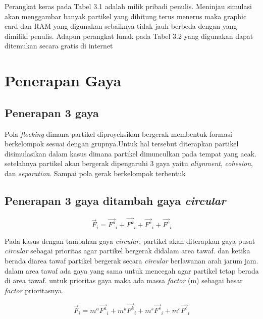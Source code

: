 \hspace{0.6cm}Perangkat keras pada Tabel 3.1 adalah milik pribadi penulis. Meninjau simulasi
akan menggambar banyak partikel yang dihitung terus menerus maka graphic card dan RAM yang digunakan sebaiknya tidak jauh berbeda dengan yang dimiliki
penulis. Adapun perangkat lunak pada Tabel 3.2 yang digunakan dapat ditemukan
secara gratis di internet



\section{Penerapan Gaya}

\subsection{Penerapan 3 gaya}
\hspace{0.6cm}Pola \emph{flocking} dimana partikel diproyeksikan bergerak membentuk formasi berkelompok sesuai dengan grupnya.Untuk hal tersebut diterapkan partikel disimulasikan dalam kasus dimana partikel dimunculkan pada tempat yang acak. setelahnya partikel akan bergerak dipengaruhi 3 gaya yaitu \emph{alignment}, \emph{cohesion}, dan \emph{separation}. Sampai pola gerak berkelompok terbentuk

\subsection{Penerapan 3 gaya ditambah gaya \emph{circular}}

\begin{equation}
\vec{F}_i = \vec{F^a}_i + \vec{F^k}_i + \vec{F^s}_i + \vec{F^c}_i
\end{equation}

\hspace{0.6cm}Pada kasus dengan tambahan gaya 
\emph{circular}, partikel akan diterapkan gaya pusat \emph{circular} sebagai prioritas agar partikel bergerak didalam area tawaf. dan ketika berada diarea tawaf partikel bergerak secara \emph{circular} berlawanan arah jarum jam. dalam area tawaf ada gaya yang sama untuk mencegah agar partikel tetap berada di area tawaf.
untuk prioritas gaya maka ada massa \emph{factor} (m) sebagai besar \emph{factor} prioritasnya.

\begin{equation}
\vec{F}_i = m^a\vec{F^a}_i + m^k\vec{F^k}_i + m^s\vec{F^s}_i + m^c\vec{F^c}_i
\end{equation}

